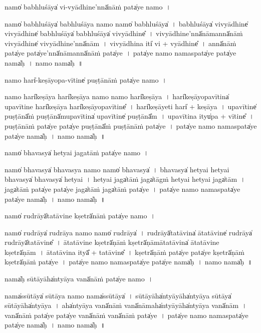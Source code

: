 \documentclass[parskip, DIV=14]{scrartcl}
\begin{document}
{\vspace{0.5cm}
namo̍  babhlu॒śāya̍ vi-vyā॒dhine'nnā̍nā॒ṁ pata̍ye॒ namo॒~।

namo̍ babhlu॒śāya̍ babhlu॒śāya॒ namo॒ namo̍ babhlu॒śāya̍~।
ba॒bhlu॒śāya̍ vivyā॒dhine̍ vivyā॒dhine̍ babhlu॒śāya̍ babhlu॒śāya̍ vivyā॒dhine̎~।
vi॒vyā॒dhine'nnā̍nā॒mannā̍nāṁ vivyā॒dhine̍ vivyā॒dhine'nnā̍nām~।
vi॒vyā॒dhina॒ iti̍ vi + vyā॒dhine̎~।
annā̍nā॒ṁ pata̍ye॒ pata̍ye'nnā̍nā॒mannā̍nā॒ṁ pata̍ye~।
pata̍ye॒ namo॒ nama॒spata̍ye॒ pata̍ye॒ nama̍ḥ~।
namo॒ nama̍ḥ~॥ 

\vspace{0.5cm}
namo॒  hari̍-keṣāyopa-vī॒tine̍ pu॒ṣṭānā॒ṁ pata̍ye॒ namo॒~।

namo॒ hari̍keṣāya॒ hari̍keṣāya॒ namo॒ namo॒ hari̍keṣāya~।
hari̍keṣāyopavī॒tina̍ upavī॒tine॒ hari̍keṣāya॒ hari̍keṣāyopavī॒tine̎~।
hari̍keṣā॒yeti॒ hari̍ + ke॒ṣā॒ya॒~।
u॒pa॒vī॒tine̍ pu॒ṣṭānā̎ṁ pu॒ṣṭānā̍mupavī॒tina̍ upavī॒tine̍ pu॒ṣṭānā̎m~।
u॒pa॒vī॒tina॒ ityu̍pa + vī॒tine̎~।
pu॒ṣṭānā॒ṁ pata̍ye॒ pata̍ye pu॒ṣṭānā̎ṁ pu॒ṣṭānā॒ṁ pata̍ye~।
pata̍ye॒ namo॒ nama॒spata̍ye॒ pata̍ye॒ nama̍ḥ~।
namo॒ nama̍ḥ~॥ 

\vspace{0.5cm}
namo̍ bha॒vasya̍ he॒tyai jagatā॒ṁ pata̍ye॒ namo॒~।

namo̍ bha॒vasya̍ bha॒vasya॒ namo॒ namo̍ bha॒vasya̍~।
bha॒vasya̍ he॒tyai he॒tyai bha॒vasya̍ bha॒vasya̍ he॒tyai~।
he॒tyai jaga̍tā॒ṁ jaga̍tāgṁ he॒tyai he॒tyai jaga̍tām~।
jaga̍tā॒ṁ pata̍ye॒ pata̍ye॒ jaga̍tā॒ṁ jaga̍tā॒ṁ pata̍ye~।
pata̍ye॒ namo॒ nama॒spata̍ye॒ pata̍ye॒ nama̍ḥ~।
namo॒ nama̍ḥ~॥ 

\vspace{0.5cm}
namo̍  ru॒drāyā̍tatā॒vine॒ kṣetrā̍nā॒ṁ pata̍ye॒ namo॒~।

namo̍  ru॒drāya̍  ru॒drāya॒ namo॒ namo̍  ru॒drāya̍~।
ru॒drāyā̍tatā॒vina̍ ātatā॒vine̍ ru॒drāya̍ ru॒drāyā̍tatā॒vine̎~।
ā॒ta॒tā॒vine॒ kṣetrā̍ṇā॒ṁ kṣetrā̍ṇāmātatā॒vina̍ ātatā॒vine॒ kṣetrā̍ṇām~।
ā॒ta॒tā॒vina॒ ityā̎ + tatā॒vine̎~।
kṣetrā̍ṇā॒ṁ pata̍ye॒ pata̍ye॒ kṣetrā̍ṇā॒ṁ kṣetrā̍ṇā॒ṁ pata̍ye~।
pata̍ye॒ namo॒ nama॒spata̍ye॒ pata̍ye॒ nama̍ḥ~।
namo॒ nama̍ḥ~॥ 

\vspace{0.5cm}
nama̍ḥ sū॒tāyāha̍ntyāya॒ vanā̍nā॒ṁ pata̍ye॒ namo॒~।

nama̍ssū॒tāya̍ sū॒tāya॒ namo॒ nama̍ssū॒tāya̍~।
sū॒tāyāha̍ntyā॒yāha̍ntyāya sū॒tāya̍ sū॒tāyāha̍ntyāya~।
aha̍ntyāya॒ vanā̍nā॒ṁ vanā̍nā॒maha̍ntyā॒yāha̍ntyāya॒ vanā̍nām~।
vanā̍nā॒ṁ pata̍ye॒ pata̍ye॒ vanā̍nā॒ṁ vanā̍nā॒ṁ pata̍ye~।
pata̍ye॒ namo॒ nama॒spata̍ye॒ pata̍ye॒ nama̍ḥ~।
namo॒ nama̍ḥ~॥ 

}
\end{document}

